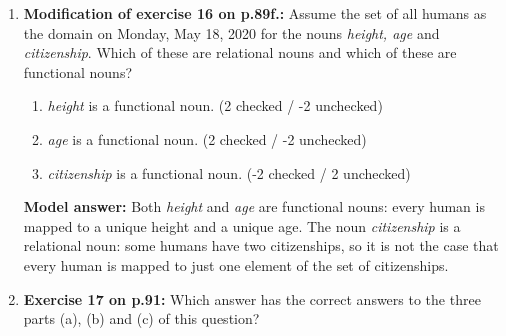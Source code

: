 \documentclass[a4,11pt]{article}
\begin{document}
\begin{enumerate}[leftmargin = 12pt]
\begin{enumerate}[noitemsep]
 	 \item R6 =  \{ $\langle$ 1, 1 $\rangle$, $\langle$ 1, 0 $\rangle$ \} \\ (-2 checked / 2 unchecked)
	 
  	 \item R7 =  \{ $\langle$ 1, 1 $\rangle$, $\langle$ 0, 1 $\rangle$ \} \\ (2 checked / -2 unchecked)
	 
\end{enumerate}

{\bf Model answer:} The relations R1, R2, R4, R5 and R7 are functions: in each of these, all elements of the domain of the relation are mapped to exactly one element of the codomain of the relation. 

The relations in R3 and R6 are not functions. R3 is not a function because `alex' is an element of the set P but not mapped to any element of the set H. R6 is not a function because the element `1' of T occurs as the first element of two pairs that differ on the second element, i.e., `1' is once mapped to `1' and once to `0'.

\item {\bf Modification of exercise 16 on p.89f.:} Assume the set of all humans as the domain on Monday, May 18, 2020 for the nouns {\em height, age} and {\em citizenship}. Which of these are relational nouns and which of these are functional nouns?

\begin{enumerate}[noitemsep]
        \item {\em height} is a functional noun. (2 checked / -2 unchecked)
        
        \item {\em age} is a functional noun. (2 checked / -2 unchecked)
                
         \item {\em citizenship} is a functional noun.  (-2 checked / 2 unchecked)
         
\end{enumerate}

{\bf Model answer:} Both {\em height} and {\em age} are functional nouns: every human is mapped to a unique height and a unique age. The noun {\em citizenship} is a relational noun: some humans have two citizenships, so it is not the case that every human is mapped to just one element of the set of citizenships.

\item {\bf Exercise 17 on p.91:} Which answer has the correct answers to the three parts (a), (b) and (c) of this question?


\end{enumerate}
\end{document}
